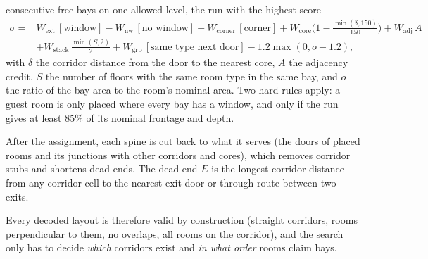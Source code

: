 \documentclass[10pt]{article}
\begin{document}
\begin{enumerate}
consecutive free bays on one allowed level, the run with the highest score
\begin{align*} \sigma ={}& W_{\text{ext}}\,[\text{window}] - W_{\text{nw}}\,[\text{no window}] + W_{\text{corner}}\,[\text{corner}]
+ W_{\text{core}}\Big(1 - \tfrac{\min(\delta,150)}{150}\Big) + W_{\text{adj}}\,A \\
&+ W_{\text{stack}}\,\tfrac{\min(S,2)}{2} + W_{\text{grp}}\,[\text{same type next door}] - 1.2\max(0, o - 1.2),
\end{align*}
with $\delta$ the corridor distance from the door to the nearest core, $A$ the adjacency credit, $S$ the number of floors
with the same room type in the same bay, and $o$ the ratio of the bay area to the room's nominal area. Two hard rules apply:
a guest room is only placed where every bay has a window, and only if the run gives at least 85\% of its nominal frontage
and depth.
\end{enumerate}
After the assignment, each spine is cut back to what it serves (the doors of placed rooms and its junctions with
other corridors and cores), which removes corridor stubs and shortens dead ends. The dead end $E$ is the longest
corridor distance from any corridor cell to the nearest exit door or through-route between two exits.

Every decoded layout is therefore valid by construction (straight corridors, rooms perpendicular to them, no overlaps, all
rooms on the corridor), and the search only has to decide \emph{which} corridors exist and \emph{in what order} rooms claim
bays.
\end{document}
